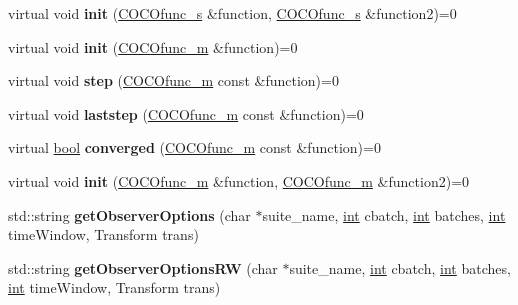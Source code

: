 \begin{DoxyCompactItemize}
\item 
virtual void {\bfseries init} (\hyperlink{classCOCOfunc__s}{C\+O\+C\+Ofunc\+\_\+s} \&function, \hyperlink{classCOCOfunc__s}{C\+O\+C\+Ofunc\+\_\+s} \&function2)=0\hypertarget{classCocoOptimiser_a00c672cfa8ee865dcd129145f68e4603}{}\label{classCocoOptimiser_a00c672cfa8ee865dcd129145f68e4603}

\item 
virtual void {\bfseries init} (\hyperlink{classCOCOfunc__m}{C\+O\+C\+Ofunc\+\_\+m} \&function)=0\hypertarget{classCocoOptimiser_a233e86d85e1a1cce1362237c8438eec7}{}\label{classCocoOptimiser_a233e86d85e1a1cce1362237c8438eec7}

\item 
virtual void {\bfseries step} (\hyperlink{classCOCOfunc__m}{C\+O\+C\+Ofunc\+\_\+m} const \&function)=0\hypertarget{classCocoOptimiser_ac0b49a56710efa416f780f367c8c3b18}{}\label{classCocoOptimiser_ac0b49a56710efa416f780f367c8c3b18}

\item 
virtual void {\bfseries laststep} (\hyperlink{classCOCOfunc__m}{C\+O\+C\+Ofunc\+\_\+m} const \&function)=0\hypertarget{classCocoOptimiser_aecc9267abf3fb0adbda635718334ecf8}{}\label{classCocoOptimiser_aecc9267abf3fb0adbda635718334ecf8}

\item 
virtual \hyperlink{classbool}{bool} {\bfseries converged} (\hyperlink{classCOCOfunc__m}{C\+O\+C\+Ofunc\+\_\+m} const \&function)=0\hypertarget{classCocoOptimiser_a506e27ab426346250585af7895eaddcc}{}\label{classCocoOptimiser_a506e27ab426346250585af7895eaddcc}

\item 
virtual void {\bfseries init} (\hyperlink{classCOCOfunc__m}{C\+O\+C\+Ofunc\+\_\+m} \&function, \hyperlink{classCOCOfunc__m}{C\+O\+C\+Ofunc\+\_\+m} \&function2)=0\hypertarget{classCocoOptimiser_aabfe7f5c629faae350ef36910a3cdd28}{}\label{classCocoOptimiser_aabfe7f5c629faae350ef36910a3cdd28}

\item 
std\+::string {\bfseries get\+Observer\+Options} (char $\ast$suite\+\_\+name, \hyperlink{classint}{int} cbatch, \hyperlink{classint}{int} batches, \hyperlink{classint}{int} time\+Window, Transform trans)\hypertarget{classCocoOptimiser_ad9591d2b76f7078a956e7cdca1d8ba60}{}\label{classCocoOptimiser_ad9591d2b76f7078a956e7cdca1d8ba60}

\item 
std\+::string {\bfseries get\+Observer\+Options\+RW} (char $\ast$suite\+\_\+name, \hyperlink{classint}{int} cbatch, \hyperlink{classint}{int} batches, \hyperlink{classint}{int} time\+Window, Transform trans)\hypertarget{classCocoOptimiser_afc334f80b0aee491d2452f7f89402d17}{}\label{classCocoOptimiser_afc334f80b0aee491d2452f7f89402d17}


\end{DoxyCompactItemize}
